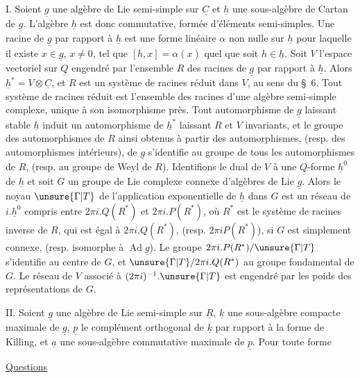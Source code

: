 I. Soient $\underline{g}$ une algèbre de Lie semi-simple sur $\underline{C}$ et $\underline{h}$ une sous-algèbre de Cartan de $\underline{g}$.
L'algèbre $\underline{h}$ est donc commutative, formée d'éléments semi-simples.
Une racine de $\underline{g}$ par rapport à $\underline{h}$ est une forme linéaire $\alpha$ non nulle sur $\underline{h}$ pour laquelle il existe $x\in\underline{g}$, $x\ne0$, tel que $[h,x]=\alpha(x)$ quel que soit $h\in\underline{h}$.
Soit $V$ l'espace vectoriel sur $\underline{Q}$ engendré par l'ensemble $R$ des racines de $\underline{g}$ par rapport à $\underline{h}$.
Alors $\underline{h}^*=V\otimes\underline{C}$, et $R$ est un système de racines réduit dans $V$, au sens du \S\ 6.
Tout système de racines réduit est l'ensemble des racines d'une algèbre semi-simple complexe, unique à son isomorphisme près.
Tout automorphisme de $\underline{g}$ laissant stable $\underline{h}$ induit un automorphisme de $\underline{h}^*$ laissant $R$ et $V$ invariants, et le groupe des automorphismes de $R$ ainsi obtenus à partir des automorphismes, (resp. des automorphismes intérieurs), de $\underline{g}$ s'identifie au groupe de tous les automorphismes de $R$, (resp. au groupe de Weyl de $R$).
Identifions le dual de $V$ à une $\underline{Q}$-forme $\underline{h}^0$ de $\underline{h}$ et soit $G$ un groupe de Lie complexe connexe d'algèbres de Lie $\underline{g}$.
Alors le noyau $\unsure{\Gamma|T}$ de l'application exponentielle de $\underline{h}$ dans $G$ est un réseau de $i.\underline{h}^0$ compris entre $2\pi i.Q(R^*)$ et $2\pi i.P(R^*)$, où $R^*$ est le système de racines inverse de $R$, qui est égal à $2\pi i.Q(R^*)$, (resp. $2\pi iP(R^*)$), si $G$ est simplement connexe, (resp. isomorphe à $\operatorname{Ad}\underline{g}$).
Le groupe $2\pi i.P(R^*)/\unsure{\Gamma|T}$ s'identifie au centre de $G$, et $\unsure{\Gamma|T}/2\pi i.Q(R^*)$ au groupe fondamental de $G$.
Le réseau de $V$ associé à $(2\pi i)^{-1}.\unsure{\Gamma|T}$ est engendré par les poids des représentations de $G$.

II. Soient $\underline{g}$ une algèbre de Lie semi-simple sur $\underline{R}$, $\underline{k}$ une sous-algèbre compacte maximale de $\underline{g}$, $\underline{p}$ le complément orthogonal de $\underline{k}$ par rapport à la forme de Killing, et $\underline{a}$ une sous-algèbre commutative maximale de $\underline{p}$. Pour toute forme

\uline{Questions}

